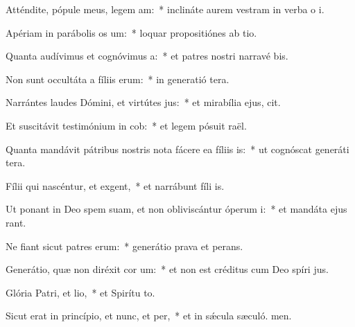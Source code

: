 \item Atténdite, pópule meus, legem am:~* inclináte aurem vestram in verba o i.
\item Apériam in parábolis os um:~* loquar propositiónes ab tio.
\item Quanta audívimus et cognóvimus a:~* et patres nostri narravé bis.
\item Non sunt occultáta a fíliis erum:~* in generatió tera.
\item Narrántes laudes Dómini, et virtútes jus:~* et mirabília ejus,  cit.
\item Et suscitávit testimónium in cob:~* et legem pósuit  raël.
\item Quanta mandávit pátribus nostris nota fácere ea fíliis is:~* ut cognóscat generáti tera.
\item Fílii qui nascéntur, et exgent,~* et narrábunt fíli is.
\item Ut ponant in Deo spem suam, et non obliviscántur óperum i:~* et mandáta ejus rant.
\item Ne fiant sicut patres erum:~* generátio prava et perans.
\item Generátio, quæ non diréxit cor um:~* et non est créditus cum Deo spíri jus.
\item Glória Patri, et lio,~* et Spirítu to.
\item Sicut erat in princípio, et nunc, et per,~* et in sǽcula sæculó. men.
